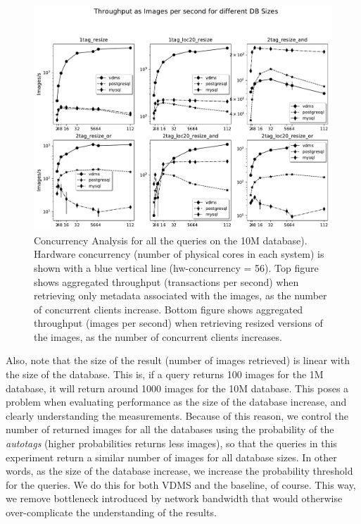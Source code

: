 \begin{figure}[ht]
\includegraphics[width=\textwidth]{figures/plot_conc_10M_mosaic_results_throughput}
\caption{Concurrency Analysis for all the queries on the 10M database).
Hardware concurrency (number of physical cores in each system)
is shown with a blue vertical line (hw-concurrency = 56).
Top figure shows aggregated throughput (transactions per second)
when retrieving only metadata associated with the images, as the number of
concurrent clients increase.
Bottom figure shows aggregated throughput (images per second) when retrieving
resized versions of the images, as the number of concurrent clients increases.}
\label{fig:concurrency_comparison_10M}
\end{figure}

Also, note that the size of the result (number of images retrieved)
is linear with the size of the database. This is, if a query returns 100 images
for the 1M database, it will return around 1000 images for the 10M database.
This poses a problem when evaluating performance as the size of the database increase,
and clearly understanding the measurements.
Because of this reason, we control the number of returned images for all the
databases using the probability of the \textit{autotags}
(higher probabilities returns less images), so that the queries in
this experiment return a similar number of images for all database sizes.
In other words, as the size of the database increase, we increase the probability
threshold for the queries. We do this for both VDMS and the baseline, of course.
This way, we remove bottleneck introduced by network bandwidth that would
otherwise over-complicate the understanding of the results.

